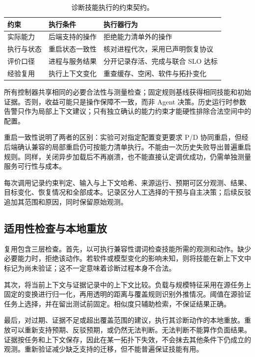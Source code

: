 \documentclass[UTF8,11pt,a4paper,fontset=windows]{ctexart}
\begin{document}
\begin{table}[htbp]
\centering\small
\begin{tabularx}{\linewidth}{@{}>{\raggedright\arraybackslash}p{26mm}YY@{}}
\toprule
约束 & 执行条件 & 执行器行为 \\
\midrule
实际能力 & 后端支持的操作 & 拒绝能力清单外的操作 \\
执行与状态 & 重启状态一致性 & 核对进程代次，采用已声明恢复协议 \\
评价口径 & 进程与服务结果 & 分开记录存活、完成与联合 SLO 达标 \\
经验复用 & 执行上下文变化 & 重查缓存、空闲、软件与拓扑变化 \\
\bottomrule
\end{tabularx}
\caption{诊断技能执行的约束契约。}
\label{tab:contracts}
\end{table}

所有控制器共享相同的必要合法性与测量检查；固定规则基线获得相同技能和初始证据。否则，收益可能只是操作保障不一致，而非 Agent 决策。历史运行时参数告警只作为局部上下文建议；只有独立确认的能力约束才能硬性排除合法空间中的配置。

重启一致性说明了两者的区别：实验可对指定配置变更要求 P/D 协同重启，但经后端确认兼容的局部重启仍可按能力清单执行。不能由一次历史失败导出普遍重启规则。同样，关闭异步加载后不再崩溃，也不能直接认定调优成功，仍需单独测量服务可行性与成本。

每次调用记录约束判定、输入与上下文哈希、来源运行、预期可区分观测、结果、目标变化、恢复情况和全部成本。记录区分人工选择的干预与自主决策；后续反驳追加其范围和原因，同时保留原始观测。

\subsection{适用性检查与本地重放}
复用包含三层检查。首先，以可执行兼容性谓词检查技能所需的观测和动作。缺少必要能力时，拒绝该动作。若软件或模型变化的影响未知，则将技能在新上下文中标记为尚未验证；这不一定意味着诊断过程本身不合法。

其次，将当前上下文与证据记录中的上下文比较。负载与规模特征采用在源任务上固定的变换进行归一化，再用透明的距离与覆盖规则识别外推情况。阈值在源验证任务上选择，并在留出测试前固定。相似度只辅助检索，不保证结果正确。

最后，对过期、证据不足或超出覆盖范围的建议，执行其诊断动作的本地重放。重放可以重新支持预期、反驳预期，或仍然无法判断。无法判断不能算作负面结果。证据按任务和上下文保存，因此在某一拓扑下失效，不会抹去其他条件下仍成立的观测。重新验证减少缺乏支持的迁移，但不能普遍保证技能有用。
\end{document}
